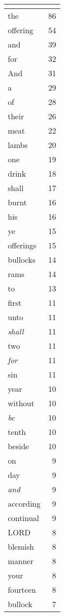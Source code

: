\begin{center}
\begin{longtable}{l|r}
\hline \multicolumn{2}{c}{{ }} \\ \hline
\endfoot 
the & 86\\ \hline 
offering & 54\\ \hline 
and & 39\\ \hline 
for & 32\\ \hline 
And & 31\\ \hline 
a & 29\\ \hline 
of & 28\\ \hline 
their & 26\\ \hline 
meat & 22\\ \hline 
lambs & 20\\ \hline 
one & 19\\ \hline 
drink & 18\\ \hline 
shall & 17\\ \hline 
burnt & 16\\ \hline 
his & 16\\ \hline 
ye & 15\\ \hline 
offerings & 15\\ \hline 
bullocks & 14\\ \hline 
rams & 14\\ \hline 
to & 13\\ \hline 
first & 11\\ \hline 
unto & 11\\ \hline 
\emph{shall} & 11\\ \hline 
two & 11\\ \hline 
\emph{for} & 11\\ \hline 
sin & 11\\ \hline 
year & 10\\ \hline 
without & 10\\ \hline 
\emph{be} & 10\\ \hline 
tenth & 10\\ \hline 
beside & 10\\ \hline 
on & 9\\ \hline 
day & 9\\ \hline 
\emph{and} & 9\\ \hline 
according & 9\\ \hline 
continual & 9\\ \hline 
LORD & 8\\ \hline 
blemish & 8\\ \hline 
manner & 8\\ \hline 
your & 8\\ \hline 
fourteen & 8\\ \hline 
bullock & 7\\ \hline 

\end{longtable}
\end{center}
